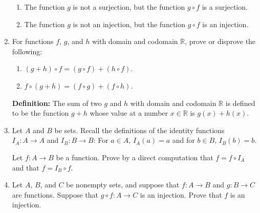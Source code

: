 \documentclass[12pt]{article}
\newcommand{\RR}{{\mathbb R}}  %
\begin{document}
\begin{enumerate}
\begin{enumerate}
  \item The function $g$ is not a surjection, but the function $g\circ f$ is a surjection.

  \item The function $g$ is not an injection, but the function $g\circ f$ is an injection.

 \end{enumerate}  



\item  For functions $f$, $g$, and $h$ with domain and codomain $\RR$, prove or disprove the following:
  
 \begin{enumerate}
    \item   $(g+h)\circ f = (g\circ f) + (h\circ f)$.

    \item   $f\circ(g+h) = (f\circ g) + (f\circ h)$.   

 \end{enumerate}  

  {\bf Definition:} The sum of two $g$ and $h$  with domain and codomain $\RR$ is defined to be the function $g+h$ whose
  value at a number $x\in \RR$ is $g(x)+h(x)$.
 


  
  \item  Let $A$ and $B$ be sets.
    Recall the definitions of the identity functions $I_A\colon A\to A$ and  $I_B\colon B\to B$:
    For $a\in A$, $I_A(a)=a$ and for $b\in B$, $I_B(b)=b$.

    Let $f\colon A\to B$ be a function.
    Prove by a direct computation that $f=f\circ I_A$ and that $f=I_B\circ f$.


\item Let $A$, $B$, and $C$ be nonempty sets, and suppose that  $f\colon A\to B$ and $g\colon B\to C$ are functions.
  Suppose that $g\circ f\colon A\to C$ is an injection.
  Prove that $f$ is an injection.


\end{enumerate}
\end{document}
